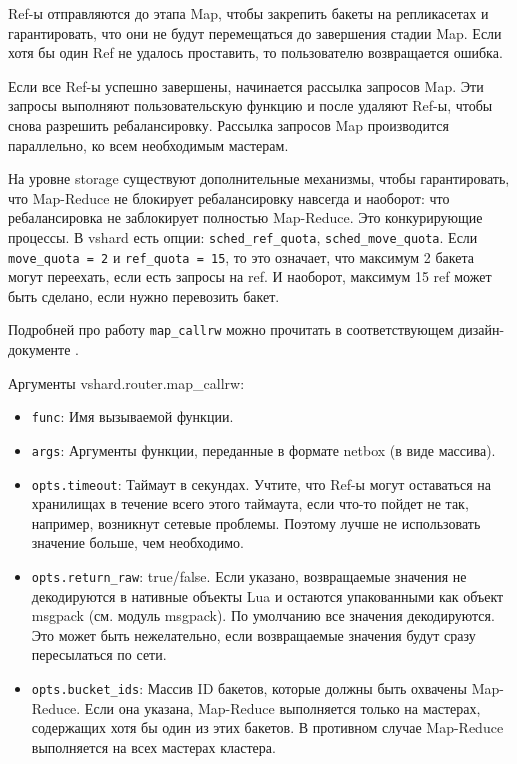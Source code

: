 Ref-ы отправляются до этапа Map, чтобы закрепить бакеты на репликасетах и
гарантировать, что они не будут перемещаться до завершения стадии Map. Если
хотя бы один Ref не удалось проставить, то пользователю возвращается ошибка.

Если все Ref-ы успешно завершены, начинается рассылка запросов Map. Эти запросы
выполняют пользовательскую функцию и после удаляют Ref-ы, чтобы снова разрешить
ребалансировку. Рассылка запросов Map производится параллельно, ко всем
необходимым мастерам.

На уровне storage существуют дополнительные механизмы, чтобы гарантировать,
что Map-Reduce не блокирует ребалансировку навсегда и наоборот: что
ребалансировка не заблокирует полностью Map-Reduce. Это конкурирующие процессы.
В vshard есть опции: \texttt{sched\_ref\_quota}, \texttt{sched\_move\_quota}.
Если \texttt{move\_quota = 2} и \texttt{ref\_quota = 15}, то это означает, что
максимум 2 бакета могут переехать, если есть запросы на ref. И наоборот,
максимум 15 ref может быть сделано, если нужно перевозить бакет.

Подробней про работу \texttt{map\_callrw} можно прочитать в соответствующем
дизайн-документе \cite{MapCallrwRfc}.

Аргументы vshard.router.map\_callrw:

\begin{itemize}
\item \texttt{func}: Имя вызываемой функции.
\item \texttt{args}: Аргументы функции, переданные в формате netbox (в виде
    массива).
\item \texttt{opts.timeout}: Таймаут в секундах. Учтите, что Ref-ы могут
    оставаться на хранилищах в течение всего этого таймаута, если что-то пойдет
        не так, например, возникнут сетевые проблемы. Поэтому лучше не
        использовать значение больше, чем необходимо.
\item \texttt{opts.return\_raw}: true/false. Если указано, возвращаемые
    значения не декодируются в нативные объекты Lua и остаются упакованными как
        объект msgpack (см. модуль msgpack). По умолчанию все значения
        декодируются. Это может быть нежелательно, если возвращаемые значения
        будут сразу пересылаться по сети.
\item \texttt{opts.bucket\_ids}: Массив ID бакетов, которые должны быть
    охвачены Map-Reduce. Если она указана, Map-Reduce выполняется только на
        мастерах, содержащих хотя бы один из этих бакетов. В противном случае
        Map-Reduce выполняется на всех мастерах кластера.
\end{itemize}

